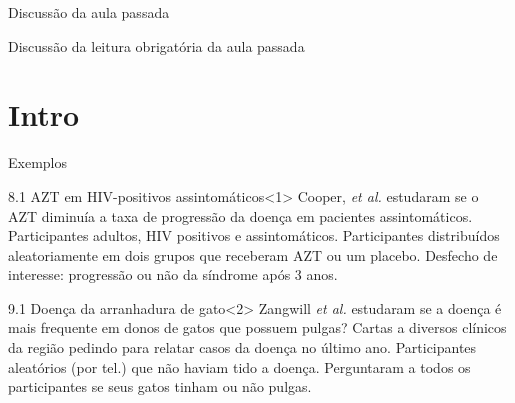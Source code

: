 \documentclass{beamer}
\begin{document}


\begin{frame}{\scriptsize Discussão da aula passada}
  \begin{block}{}
    Discussão da leitura obrigatória da aula passada
  \end{block}
\end{frame}

\section{Intro}

\begin{frame}{\scriptsize Exemplos}
  \begin{exampleblock}{8.1 AZT em HIV-positivos assintomáticos}<1>
    Cooper, {\em et al.} estudaram se o AZT diminuía a taxa de progressão da doença em pacientes assintomáticos.
    Participantes adultos, HIV positivos e assintomáticos.
    Participantes distribuídos aleatoriamente em dois grupos que receberam AZT ou um placebo.
    Desfecho de interesse: progressão ou não da síndrome após 3 anos.
  \end{exampleblock}
  \begin{exampleblock}{9.1 Doença da arranhadura de gato}<2>
    Zangwill {\em et al.} estudaram se a doença é mais frequente em donos de gatos que possuem pulgas?
    Cartas a diversos clínicos da região pedindo para relatar casos da doença no último ano.
    Participantes aleatórios (por tel.) que não haviam tido a doença.
    Perguntaram a todos os participantes se seus gatos tinham ou não pulgas.
  \end{exampleblock}
\end{frame}
\end{document}
